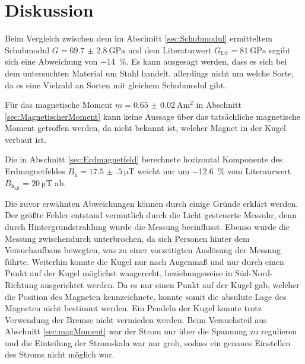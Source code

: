 \section{Diskussion}
\label{sec:Diskussion}
Beim Vergleich zwischen dem im Abschnitt \ref{sec:Schubmodul} ermitteltem
Schubmodul $G = \SI{69.7(28)}{\giga\pascal}$ und dem Literaturwert
$G_\text{Lit} = \SI{81}{\giga\pascal}$ \cite{Stahl} ergibt sich eine Abweichung
von \SI{-14}{\percent}. Es kann ausgesagt werden, dass es sich bei dem untersuchten
Material um Stahl handelt, allerdings nicht um welche Sorte, da es eine
Vielzahl an Sorten mit gleichem Schubmodul \cite{Stahl} gibt.

Für das magnetische Moment $m = \SI{0.65(2)}{\ampere\meter\squared}$ in
Abschnitt \ref{sec:MagnetischerMoment} kann keine
Aussage über das tatsächliche magnetische Moment getroffen werden, da nicht bekannt ist,
welcher Magnet in der Kugel verbaut ist.

Die in Abschnitt \ref{sec:Erdmagnetfeld} berechnete horizontal Komponente des
Erdmagnetfeldes $B_\text{h} = \SI{17.5(5)}{\micro\tesla}$ weicht nur um \SI{-12.6}{\percent}
vom Literaurwert $B_{\text{h}_\text{Lit}} = \SI{20}{\micro\tesla}$ \cite{Biosensor} ab.

Die zuvor erwähnten Abweichungen können durch einige Gründe erklärt werden. Der
größte Fehler entstand vermutlich durch die Licht gesteuerte Messuhr, denn
durch Hintergrundstrahlung wurde die Messung beeinflusst. Ebenso wurde die Messung
zwischendurch unterbrochen, da sich Personen hinter dem Versuchaufbaus bewegten,
was zu einer vorzeitigten Auslösung der Messung führte. Weiterhin konnte die
Kugel nur nach Augenmaß und nur durch einen Punkt auf der Kugel möglichst waagerecht,
beziehungsweise in Süd-Nord-Richtung ausgerichtet werden. Da es nur einen Punkt
auf der Kugel gab, welcher die Position des Magneten kennzeichnete, konnte
somit die absulute Lage des Magneten nicht bestimmt werden.
Ein Pendeln der Kugel konnte trotz Verwendung der Bremse nicht vermieden werden.
Beim Versuchsteil aus Abschnitt \ref{sec:magMoment} war der Strom nur über die
Spannung zu regulieren und die Einteilung der Stromskala war nur grob, sodass
ein genaues Einstellen des Stroms nicht möglich war.
